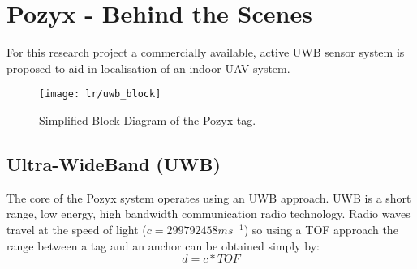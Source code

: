 \section{Pozyx - Behind the Scenes}\label{sec:pozyx---behind-the-scenes}
For this research project a commercially available, active UWB sensor system is proposed to aid in localisation of an indoor UAV system.
\begin{figure}[h!]
    \centering
    \texttt{[image: lr/uwb\_block]}
    \caption{Simplified Block Diagram of the Pozyx tag.}
\end{figure}
\subsection{Ultra-WideBand (UWB)}
The core of the Pozyx system operates using an UWB approach.
UWB is a short range, low energy, high bandwidth communication radio technology.
Radio waves travel at the speed of light ($c=299792458ms^{-1}$) so using a TOF approach the range between a tag and an anchor can be obtained simply by:
\[
    d = c*TOF
\]

